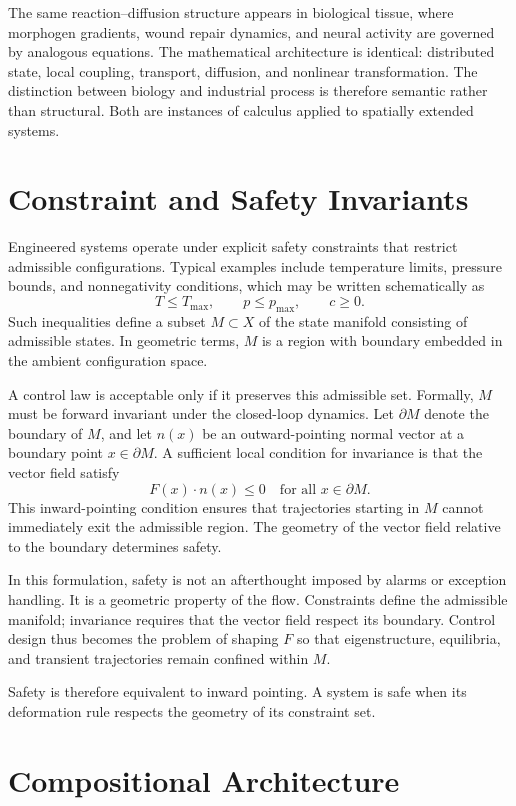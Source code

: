 \documentclass[12pt]{book}
\begin{document}
The same reaction--diffusion structure appears in biological tissue,
where morphogen gradients, wound repair dynamics, and neural activity
are governed by analogous equations. The mathematical architecture is
identical: distributed state, local coupling, transport, diffusion,
and nonlinear transformation. The distinction between biology and
industrial process is therefore semantic rather than structural. Both
are instances of calculus applied to spatially extended systems.

\section{Constraint and Safety Invariants}

Engineered systems operate under explicit safety constraints that
restrict admissible configurations. Typical examples include
temperature limits, pressure bounds, and nonnegativity conditions,
which may be written schematically as
\[
T \le T_{\max},
\qquad
p \le p_{\max},
\qquad
c \ge 0.
\]
Such inequalities define a subset $M \subset X$ of the state manifold
consisting of admissible states. In geometric terms, $M$ is a region
with boundary embedded in the ambient configuration space.

A control law is acceptable only if it preserves this admissible set.
Formally, $M$ must be forward invariant under the closed-loop dynamics.
Let $\partial M$ denote the boundary of $M$, and let $n(x)$ be an
outward-pointing normal vector at a boundary point $x \in \partial M$.
A sufficient local condition for invariance is that the vector field
satisfy
\[
F(x) \cdot n(x) \le 0
\quad \text{for all } x \in \partial M.
\]
This inward-pointing condition ensures that trajectories starting in
$M$ cannot immediately exit the admissible region. The geometry of the
vector field relative to the boundary determines safety.

In this formulation, safety is not an afterthought imposed by alarms
or exception handling. It is a geometric property of the flow.
Constraints define the admissible manifold; invariance requires that
the vector field respect its boundary. Control design thus becomes the
problem of shaping $F$ so that eigenstructure, equilibria, and
transient trajectories remain confined within $M$.

Safety is therefore equivalent to inward pointing. A system is safe
when its deformation rule respects the geometry of its constraint set.

\section{Compositional Architecture}
\end{document}
